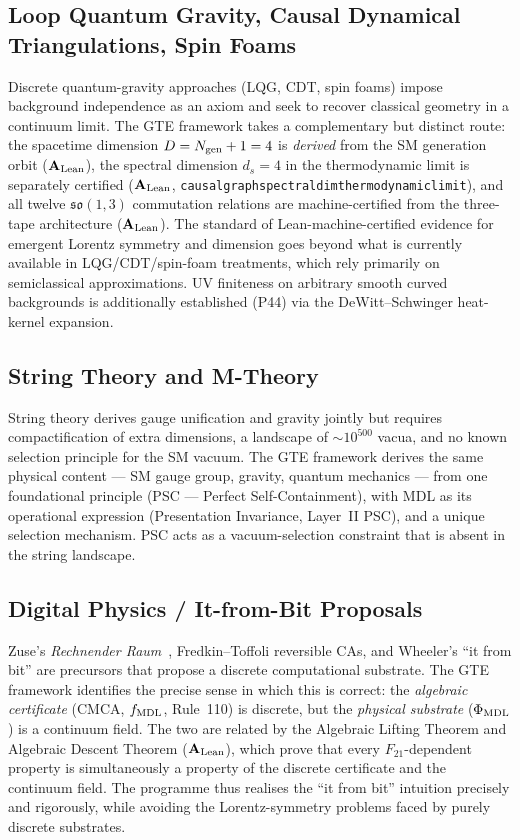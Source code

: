 \documentclass[11pt]{article}
\newcommand{\lean}[1]{%
  \penalty-100
  \begingroup\def\_{{\textunderscore\allowbreak}}\texttt{#1}\endgroup}
\newcommand{\CatAL}{\ensuremath{\textbf{A}_{\rm Lean}}}
\begin{document}
\subsection{Loop Quantum Gravity, Causal Dynamical Triangulations, Spin Foams}

Discrete quantum-gravity approaches (LQG, CDT, spin foams) impose background
independence as an axiom and seek to recover classical geometry in a continuum limit.
The GTE framework takes a complementary but distinct route: the spacetime dimension
$D = N_{\rm gen} + 1 = 4$ is \emph{derived} from the SM generation orbit ($\CatAL$),
the spectral dimension $d_s = 4$ in the thermodynamic limit is separately certified
($\CatAL$, \lean{causal\_graph\_spectral\_dim\_thermodynamic\_limit}), and all twelve
$\mathfrak{so}(1,3)$ commutation relations are machine-certified from the
three-tape architecture ($\CatAL$).  The standard of Lean-machine-certified evidence
for emergent Lorentz symmetry and dimension goes beyond what is currently available
in LQG/CDT/spin-foam treatments, which rely primarily on semiclassical approximations.
UV finiteness on arbitrary smooth curved backgrounds is additionally established
(P44) via the DeWitt--Schwinger heat-kernel expansion.

\subsection{String Theory and M-Theory}

String theory derives gauge unification and gravity jointly but requires compactification
of extra dimensions, a landscape of $\sim 10^{500}$ vacua, and no known selection
principle for the SM vacuum.  The GTE framework derives the same physical content
--- SM gauge group, gravity, quantum mechanics --- from one foundational principle
(PSC --- Perfect Self-Containment), with MDL as its operational expression
(Presentation Invariance, Layer~II PSC), and a unique selection mechanism.
PSC acts as a vacuum-selection constraint that is absent in the string landscape.

\subsection{Digital Physics / It-from-Bit Proposals}

Zuse's \emph{Rechnender Raum}~\cite{Zuse1969}, Fredkin--Toffoli reversible CAs, and
Wheeler's ``it from bit'' are precursors that propose a discrete computational
substrate.  The GTE framework identifies the precise sense in which this is correct: the
\emph{algebraic certificate} (CMCA, $f_{\rm MDL}$, Rule~110) is discrete, but the
\emph{physical substrate} ($\Phi_{\rm MDL}$) is a continuum field.  The two are related
by the Algebraic Lifting Theorem and Algebraic Descent Theorem ($\CatAL$), which
prove that every $F_{21}$-dependent property is simultaneously a property of the
discrete certificate and the continuum field.  The programme thus realises the
``it from bit'' intuition precisely and rigorously, while avoiding the Lorentz-symmetry
problems faced by purely discrete substrates.
\end{document}
